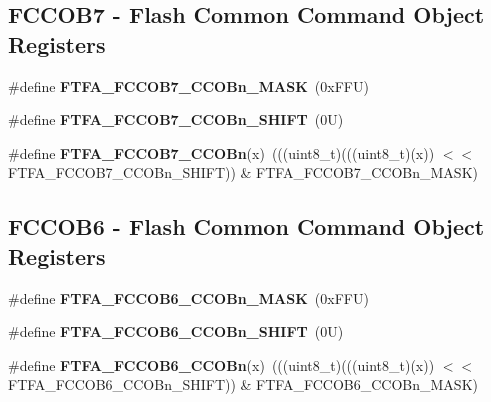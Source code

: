 \subsection*{F\+C\+C\+O\+B7 -\/ Flash Common Command Object Registers}
\begin{DoxyCompactItemize}
\item 
\mbox{\label{group___f_t_f_a___register___masks_ga0fe4a465120d3602ebe4c144d3905534}} 
\#define {\bfseries F\+T\+F\+A\+\_\+\+F\+C\+C\+O\+B7\+\_\+\+C\+C\+O\+Bn\+\_\+\+M\+A\+SK}~(0x\+F\+F\+U)
\item 
\mbox{\label{group___f_t_f_a___register___masks_ga4281fe52969c1c18536f869c7cf8d2ac}} 
\#define {\bfseries F\+T\+F\+A\+\_\+\+F\+C\+C\+O\+B7\+\_\+\+C\+C\+O\+Bn\+\_\+\+S\+H\+I\+FT}~(0\+U)
\item 
\mbox{\label{group___f_t_f_a___register___masks_ga0d42424606f078959076e45bf6f45c3d}} 
\#define {\bfseries F\+T\+F\+A\+\_\+\+F\+C\+C\+O\+B7\+\_\+\+C\+C\+O\+Bn}(x)~(((uint8\+\_\+t)(((uint8\+\_\+t)(x)) $<$$<$ F\+T\+F\+A\+\_\+\+F\+C\+C\+O\+B7\+\_\+\+C\+C\+O\+Bn\+\_\+\+S\+H\+I\+FT)) \& F\+T\+F\+A\+\_\+\+F\+C\+C\+O\+B7\+\_\+\+C\+C\+O\+Bn\+\_\+\+M\+A\+SK)
\end{DoxyCompactItemize}
\subsection*{F\+C\+C\+O\+B6 -\/ Flash Common Command Object Registers}
\begin{DoxyCompactItemize}
\item 
\mbox{\label{group___f_t_f_a___register___masks_ga35746ac0168b284ea3f29b1b6f47d932}} 
\#define {\bfseries F\+T\+F\+A\+\_\+\+F\+C\+C\+O\+B6\+\_\+\+C\+C\+O\+Bn\+\_\+\+M\+A\+SK}~(0x\+F\+F\+U)
\item 
\mbox{\label{group___f_t_f_a___register___masks_gaf859b028e8f5d2dfdbaed9aeccc6c66c}} 
\#define {\bfseries F\+T\+F\+A\+\_\+\+F\+C\+C\+O\+B6\+\_\+\+C\+C\+O\+Bn\+\_\+\+S\+H\+I\+FT}~(0\+U)
\item 
\mbox{\label{group___f_t_f_a___register___masks_ga4c7674945e3f13c18ff9af0a27bf3340}} 
\#define {\bfseries F\+T\+F\+A\+\_\+\+F\+C\+C\+O\+B6\+\_\+\+C\+C\+O\+Bn}(x)~(((uint8\+\_\+t)(((uint8\+\_\+t)(x)) $<$$<$ F\+T\+F\+A\+\_\+\+F\+C\+C\+O\+B6\+\_\+\+C\+C\+O\+Bn\+\_\+\+S\+H\+I\+FT)) \& F\+T\+F\+A\+\_\+\+F\+C\+C\+O\+B6\+\_\+\+C\+C\+O\+Bn\+\_\+\+M\+A\+SK)
\end{DoxyCompactItemize}
